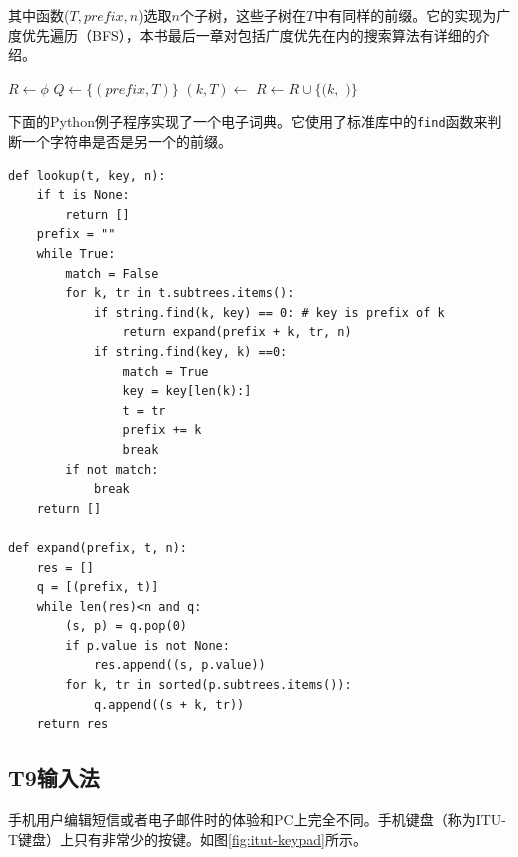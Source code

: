 \documentclass[b5paper]{ctexart}
\begin{document}
其中函数($T, prefix, n$)选取$n$个子树，这些子树在$T$中有同样的前缀。它的实现为广度优先遍历（BFS），本书最后一章对包括广度优先在内的搜索算法有详细的介绍。

\begin{algorithmic}[1]
  \State $R \gets \phi$
  \State $Q \gets \{(prefix, T)\}$
    \State $(k, T) \gets$ 
      \State $R \gets R \cup \{(k, $  $)\}$
    \EndIf
      \State {}
    \EndFor
  \EndWhile
\EndFunction
\end{algorithmic}

下面的Python例子程序实现了一个电子词典。它使用了标准库中的\texttt{find}函数来判断一个字符串是否是另一个的前缀。

\lstset{language=Python}
\begin{lstlisting}
def lookup(t, key, n):
    if t is None:
        return []
    prefix = ""
    while True:
        match = False
        for k, tr in t.subtrees.items():
            if string.find(k, key) == 0: # key is prefix of k
                return expand(prefix + k, tr, n)
            if string.find(key, k) ==0:
                match = True
                key = key[len(k):]
                t = tr
                prefix += k
                break
        if not match:
            break
    return []

def expand(prefix, t, n):
    res = []
    q = [(prefix, t)]
    while len(res)<n and q:
        (s, p) = q.pop(0)
        if p.value is not None:
            res.append((s, p.value))
        for k, tr in sorted(p.subtrees.items()):
            q.append((s + k, tr))
    return res
\end{lstlisting}


\subsection{T9输入法}

手机用户编辑短信或者电子邮件时的体验和PC上完全不同。手机键盘（称为ITU-T键盘）上只有非常少的按键。如图\ref{fig:itut-keypad}所示。
\end{document}
